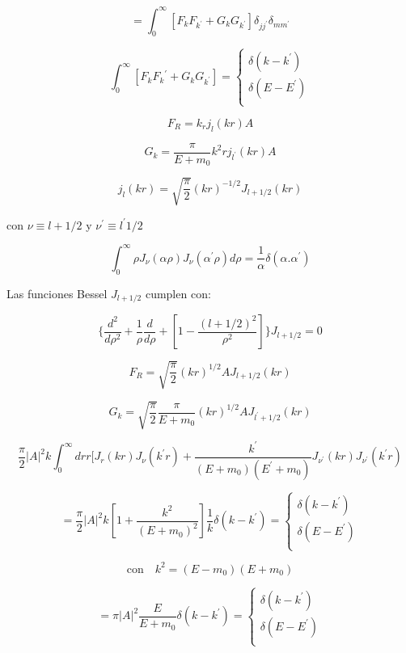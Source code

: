 \documentclass{report}
\begin{document}
\[= \int _{0}^{\infty} [F_{k} F_{k^{\prime}} + G_{k} G_{k^{\prime}}] \delta _{j j^{\prime}} \delta_{m m^{\prime}}\]

\[\int_{0}^{\infty} [F_k F_k{^{\prime}} + G_{k} G_{k^{\prime}}] = \begin{cases}
    \delta(k-k^{\prime})\\
    \delta(E-E^{\prime})\\
  \end{cases}\]

\[F_R = k _r j_l (kr) A\]

\[G_k = \frac{\pi}{E+m_0 } k^2 r j_{l^{\prime}}(kr)A\]

\[j_l (kr) = \sqrt{\frac{\pi}{2}}(kr)^{-1/2}J_{l+1/2} (kr)\]

con $\nu \equiv l + 1/2$ y $\nu ^{\prime} \equiv l^{\prime} 
 1/2$

\[\int_{0}^{\infty} \rho J_{\nu}(\alpha \rho) J_{\nu} (\alpha ^{\prime}\rho ) d \rho = \frac{1}{\alpha } \delta (\alpha . \alpha ^{\prime}) \]

Las funciones Bessel $J_{l+1/2}$ cumplen con:

\begin{equation}
\lbrace \frac{d^2}{d \rho ^2} + \frac{1}{\rho} \frac{d}{d \rho } + [1- \frac{(l+1/2)^2}{\rho ^2}] \rbrace J_{l+1/2} = 0
\end{equation}

\[F_{R} = \sqrt{\frac{\pi}{2}}(kr)^{1/2} A J_{l+1/2} (kr)\]

\[G_k = \sqrt{\frac{\pi}{2}} \frac{\pi}{E+m_0 } (kr)^{1/2} A J_{l^{\prime}+1/2} (kr)\]

\[\frac{\pi}{2} |A|^2 k \int _{0}^{\infty} dr r[J_r (kr) J_{\nu} (k^{\prime}r)+ \frac{k^{\prime}}{(E+m_0 )(E^{\prime}+m_0 )} J_{\nu^{\prime}} (kr) J_{\nu^{\prime}}(k^{\prime}r)\]

\[= \frac{\pi}{2} |A|^2 k [1 + \frac{k^2}{(E+m_0 )^2}] \frac{1}{k} \delta (k-k^{\prime}) = \begin{cases}
    \delta (k-k^{\prime})\\
    \delta(E-E^{\prime})\\
  \end{cases}\]

\[\text{con} \quad k^2 = (E-m_0 )(E+m_0 )\]

\[= \pi |A|^{2} \frac{E}{E+m_0 } \delta (k-k^{\prime}) = \begin{cases}
    \delta (k-k^{\prime})\\
    \delta(E-E^{\prime})\\
  \end{cases} \]
\end{document}
